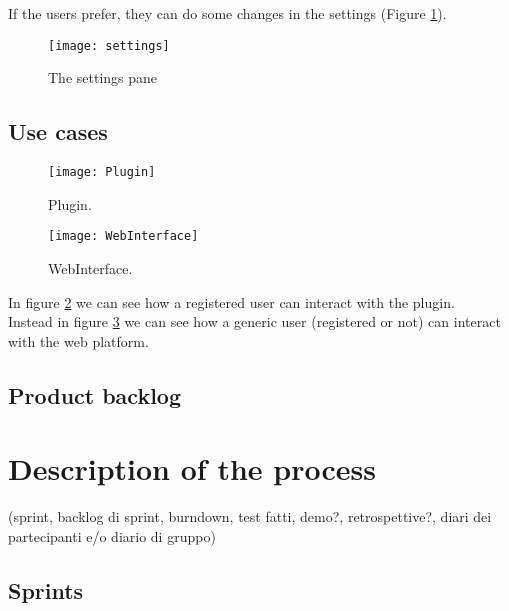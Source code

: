\documentclass[a4paper,10pt]{report}
\begin{document}
\newpage
If the users prefer, they can do some changes in the settings (Figure \ref{fig:settings}).




\begin{figure}[h]
	\centering 
	\texttt{[image: settings]}
	\caption{The settings pane}
	\label{fig:settings}
\end{figure}



\newpage
\section{Use cases} %

\begin{figure}[H]
	\centering
    \texttt{[image: Plugin]}
    \caption{Plugin.}
    \label{fig:plugin}
\end{figure}

\begin{figure}[H]
	\centering
    \texttt{[image: WebInterface]}
    \caption{WebInterface.}
    \label{fig:web}
\end{figure}

In figure \ref{fig:plugin} we can see how a registered user can interact with the plugin.\\
Instead in figure \ref{fig:web} we can see how a generic user (registered or not) can interact with the web platform.\\

\section{Product backlog} %

\chapter{Description of the process} %
(sprint, backlog di sprint, burndown, test fatti, demo?, retrospettive?, diari dei partecipanti e/o diario di gruppo)
\section{Sprints} %
\end{document}
